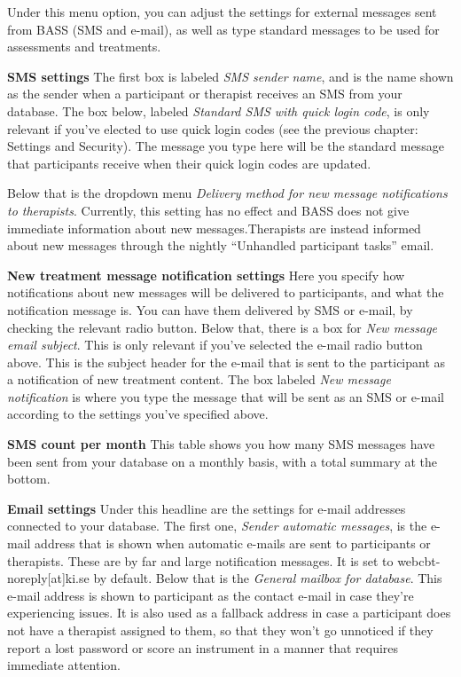 \documentclass[
]{book}
\begin{document}
Under this menu option, you can adjust the settings for external messages sent from BASS (SMS and e-mail), as well as type standard messages to be used for assessments and treatments.

\textbf{SMS settings}
The first box is labeled \emph{SMS sender name}, and is the name shown as the sender when a participant or therapist receives an SMS from your database.
The box below, labeled \emph{Standard SMS with quick login code}, is only relevant if you've elected to use quick login codes (see the previous chapter: Settings and Security). The message you type here will be the standard message that participants receive when their quick login codes are updated.

Below that is the dropdown menu \emph{Delivery method for new message notifications to therapists}. Currently, this setting has no effect and BASS does not give immediate information about new messages.Therapists are instead informed about new messages through the nightly ``Unhandled participant tasks'' email.

\textbf{New treatment message notification settings}
Here you specify how notifications about new messages will be delivered to participants, and what the notification message is. You can have them delivered by SMS or e-mail, by checking the relevant radio button.
Below that, there is a box for \emph{New message email subject}. This is only relevant if you've selected the e-mail radio button above. This is the subject header for the e-mail that is sent to the participant as a notification of new treatment content.
The box labeled \emph{New message notification} is where you type the message that will be sent as an SMS or e-mail according to the settings you've specified above.

\textbf{SMS count per month}
This table shows you how many SMS messages have been sent from your database on a monthly basis, with a total summary at the bottom.

\textbf{Email settings}
Under this headline are the settings for e-mail addresses connected to your database. The first one, \emph{Sender automatic messages}, is the e-mail address that is shown when automatic e-mails are sent to participants or therapists. These are by far and large notification messages. It is set to webcbt-noreply{[}at{]}ki.se by default.
Below that is the \emph{General mailbox for database}. This e-mail address is shown to participant as the contact e-mail in case they're experiencing issues. It is also used as a fallback address in case a participant does not have a therapist assigned to them, so that they won't go unnoticed if they report a lost password or score an instrument in a manner that requires immediate attention.
\end{document}

